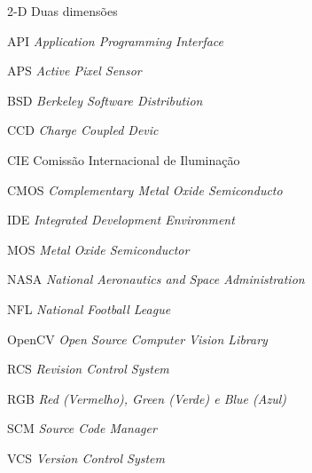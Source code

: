 \begin{siglas}
  \item[2-D] Duas dimensões
  \item[API] \textit{Application Programming Interface}
  \item[APS] \textit{Active Pixel Sensor}
  \item[BSD] \textit{Berkeley Software Distribution}
  \item[CCD] \textit{Charge Coupled Devic}
  \item[CIE] Comissão Internacional de Iluminação
  \item[CMOS] \textit{Complementary Metal Oxide Semiconducto}
  \item[IDE] \textit{Integrated Development Environment}
  \item[MOS] \textit{Metal Oxide Semiconductor}
  \item[NASA] \textit{National Aeronautics and Space Administration}
  \item[NFL] \textit{National Football League}
  \item[OpenCV] \textit{Open Source Computer Vision Library}
  \item[RCS] \textit{Revision Control System}
  \item[RGB] \textit{Red (Vermelho), Green (Verde) e Blue (Azul)}
  \item[SCM] \textit{Source Code Manager}
  \item[VCS] \textit{Version Control System}
\end{siglas}